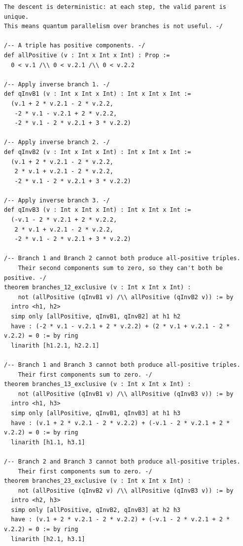 \documentclass[11pt,openright,twoside]{book}
\theoremstyle{definition}
\begin{document}
\begin{lstlisting}[style=lean]
The descent is deterministic: at each step, the valid parent is unique.
This means quantum parallelism over branches is not useful. -/

/-- A triple has positive components. -/
def allPositive (v : Int x Int x Int) : Prop :=
  0 < v.1 /\\ 0 < v.2.1 /\\ 0 < v.2.2

/-- Apply inverse branch 1. -/
def qInvB1 (v : Int x Int x Int) : Int x Int x Int :=
  (v.1 + 2 * v.2.1 - 2 * v.2.2,
   -2 * v.1 - v.2.1 + 2 * v.2.2,
   -2 * v.1 - 2 * v.2.1 + 3 * v.2.2)

/-- Apply inverse branch 2. -/
def qInvB2 (v : Int x Int x Int) : Int x Int x Int :=
  (v.1 + 2 * v.2.1 - 2 * v.2.2,
   2 * v.1 + v.2.1 - 2 * v.2.2,
   -2 * v.1 - 2 * v.2.1 + 3 * v.2.2)

/-- Apply inverse branch 3. -/
def qInvB3 (v : Int x Int x Int) : Int x Int x Int :=
  (-v.1 - 2 * v.2.1 + 2 * v.2.2,
   2 * v.1 + v.2.1 - 2 * v.2.2,
   -2 * v.1 - 2 * v.2.1 + 3 * v.2.2)

/-- Branch 1 and Branch 2 cannot both produce all-positive triples.
    Their second components sum to zero, so they can't both be positive. -/
theorem branches_12_exclusive (v : Int x Int x Int) :
    not (allPositive (qInvB1 v) /\\ allPositive (qInvB2 v)) := by
  intro <h1, h2>
  simp only [allPositive, qInvB1, qInvB2] at h1 h2
  have : (-2 * v.1 - v.2.1 + 2 * v.2.2) + (2 * v.1 + v.2.1 - 2 * v.2.2) = 0 := by ring
  linarith [h1.2.1, h2.2.1]

/-- Branch 1 and Branch 3 cannot both produce all-positive triples.
    Their first components sum to zero. -/
theorem branches_13_exclusive (v : Int x Int x Int) :
    not (allPositive (qInvB1 v) /\\ allPositive (qInvB3 v)) := by
  intro <h1, h3>
  simp only [allPositive, qInvB1, qInvB3] at h1 h3
  have : (v.1 + 2 * v.2.1 - 2 * v.2.2) + (-v.1 - 2 * v.2.1 + 2 * v.2.2) = 0 := by ring
  linarith [h1.1, h3.1]

/-- Branch 2 and Branch 3 cannot both produce all-positive triples.
    Their first components sum to zero. -/
theorem branches_23_exclusive (v : Int x Int x Int) :
    not (allPositive (qInvB2 v) /\\ allPositive (qInvB3 v)) := by
  intro <h2, h3>
  simp only [allPositive, qInvB2, qInvB3] at h2 h3
  have : (v.1 + 2 * v.2.1 - 2 * v.2.2) + (-v.1 - 2 * v.2.1 + 2 * v.2.2) = 0 := by ring
  linarith [h2.1, h3.1]


\end{lstlisting}
\end{document}
